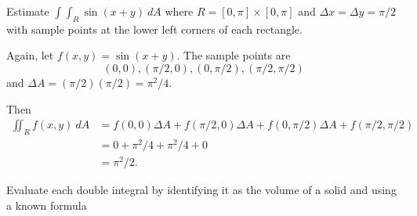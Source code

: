 \documentclass[12pt]{exam}
\begin{document}
\begin{questions}
\question Estimate \(\int\int_{R}\sin(x+y)~ dA\) where \(R=[0,\pi]\times[0,\pi]\) and \(\Delta x=\Delta y=\pi/2\) with sample points at the lower left corners of each rectangle.
\ifprintanswers
        \begin{solution}
            Again, let \(f(x,y)=\sin(x+y)\). The sample points are 
            \[
                (0,0),(\pi/2,0),(0,\pi/2),(\pi/2,\pi/2)
            \]
            and \(\Delta A=(\pi/2)(\pi/2)=\pi^2/4\).

            Then 
            \begin{align*}
                \iint_{R}f(x,y)~dA & = f(0,0)\Delta A+f(\pi/2,0)\Delta A+f(0,\pi/2)\Delta A+f(\pi/2,\pi/2)\\
                    & = 0+\pi^2/4+\pi^2/4+0\\
                    & = \pi^2/2.
            \end{align*}
        \end{solution}
    \else
        \vfill
    \fi

\newpage

\question Evaluate each double integral by identifying it as the volume of a solid and using a known formula
\end{questions}
\end{document}
